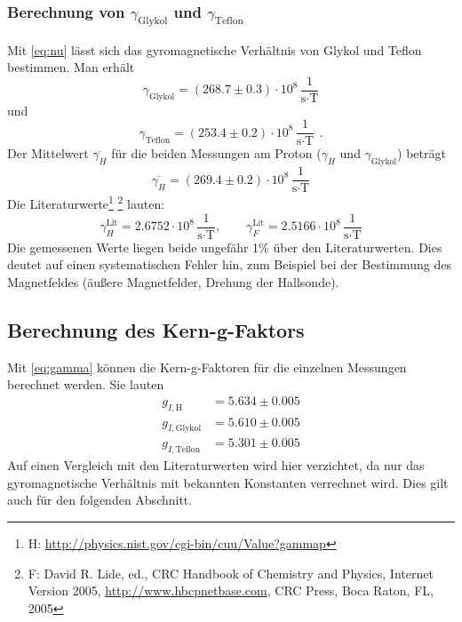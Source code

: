 \subsubsection{Berechnung von $\gamma_\text{Glykol}$ und $\gamma_\text{Teflon}$}
Mit \autoref{eq:nu} lässt sich das gyromagnetische Verhältnis von Glykol und Teflon bestimmen.
Man erhält
\begin{equation}
  \gamma_{\text{Glykol}} = (268.7 \pm 0.3) \cdot 10^8\,\frac{1}{\text{s} \cdot \text{T}}
\end{equation}
und
\begin{equation}
  \gamma_{\text{Teflon}} = (253.4 \pm 0.2) \cdot 10^8\,\frac{1}{\text{s} \cdot \text{T}} \ \, .
\end{equation}
Der Mittelwert $\overline{\gamma_H}$ für die beiden Messungen am Proton ($\gamma_{H}$ und $\gamma_{\text{Glykol}}$) beträgt
\begin{equation}
  \overline{\gamma_H} = (269.4 \pm 0.2) \cdot 10^8\,\frac{1}{\text{s} \cdot \text{T}}
\end{equation}
Die Literaturwerte\footnote{H: \url{http://physics.nist.gov/cgi-bin/cuu/Value?gammap}} 
\footnote{F: David R. Lide, ed., CRC Handbook of Chemistry
and Physics, Internet Version 2005, \url{http://www.hbcpnetbase.com}, CRC Press, Boca Raton, FL, 2005} lauten:
\begin{equation}
  \gamma_H^\text{Lit} = 2.6752 \cdot 10^8 \,\frac{1}{\text{s} \cdot \text{T}}, \qquad 
  \gamma_F^\text{Lit} = 2.5166 \cdot 10^8 \,\frac{1}{\text{s} \cdot \text{T}}
\end{equation}
Die gemessenen Werte liegen beide ungefähr 1\% über den Literaturwerten. Dies deutet auf einen systematischen Fehler hin, zum Beispiel bei der 
Bestimmung des Magnetfeldes (äußere Magnetfelder, Drehung der Hallsonde).

\subsection{Berechnung des Kern-g-Faktors}
Mit \autoref{eq:gamma} können die Kern-g-Faktoren für die einzelnen Messungen berechnet werden.
Sie lauten
\begin{equation}
\begin{split}
g_{I,\text{H}}&= 5.634	\pm 0.005\\
g_{I,\text{Glykol}}&= 5.610	\pm 0.005\\
g_{I,\text{Teflon}}&= 5.301 \pm	0.005
\end{split}
\end{equation}
Auf einen Vergleich mit den Literaturwerten wird hier verzichtet, da nur das gyromagnetische Verhältnis mit bekannten Konstanten verrechnet wird. 
Dies gilt auch für den folgenden Abschnitt.



